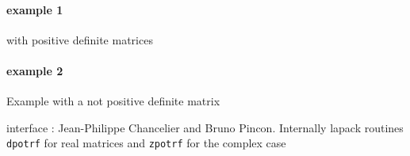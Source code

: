 \begin{examples}
\paragraph{example 1} with positive definite matrices 
  \begin{program}
  \end{program}
  \paragraph{example 2} Example with a not positive definite matrix
  \begin{program}
  \end{program}
\end{examples}

\begin{manseealso}
\end{manseealso}

\begin{authors}
   interface : Jean-Philippe Chancelier and Bruno Pincon. Internally lapack routines \verb+dpotrf+ for real matrices 
   and \verb+zpotrf+ for the complex case
\end{authors}


 
 
  
